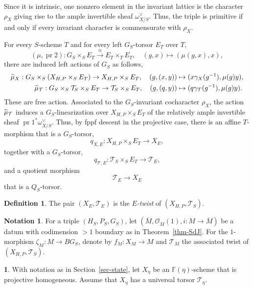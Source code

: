\documentclass[11pt]{article}
\theoremstyle{definition}
\newtheorem{defi}[theo]{Definition}
\newtheorem{nota}[theo]{Notation}
\newcommand{\enoncename}{}
\newtheorem{corpusenonce}[theo]{\enoncename}
\newenvironment{enonce}[1]{\renewcommand{\enoncename}{#1}\begin{corpusenonce}}{\end{corpusenonce}}
\numberwithin{equation}{section}
\numberwithin{figure}{section}
\numberwithin{table}{section}
\newcommand{\mbb}{\mathbb}
\newcommand{\FF}{\mbb{F}}
\newcommand{\mc}{\mathcal}
\newcommand{\mcT}{\mc{T}}
\newcommand{\OO}{\mc{O}}
\newcommand{\ol}{\overline}
\newcommand{\Xx}{X}
\DeclareMathOperator{\prm}{pr}
\let\oldtilde\tilde
\renewcommand*{\tilde}[1]{\mathchoice{\widetilde{#1}}{\widetilde{#1}}{\oldtilde{#1}}{\oldtilde{#1}}}\let\oldhat\hat
\renewcommand*{\hat}[1]{\mathchoice{\widehat{#1}}{\widehat{#1}}{\oldhat{#1}}{\oldhat{#1}}}
\begin{document}
Since it is intrinsic, one nonzero element in the invariant lattice is the character $\rho_X$ giving rise to the ample invertible sheaf $\omega^\vee_{X/S}$. Thus, the triple is primitive if and only if every invariant character is commensurate with $\rho_X$.

For every $S$-scheme $T$ and for every left $G_S$-torsor $E_T$ over $T$,
\[
(\mu,\prm{2}):G_S\times_S E_T \xrightarrow{\cong} E_T\times_T E_T,\quad (g,x)\mapsto (\mu(g,x),x),
\]
there are induced left actions of $G_S$ as follows,
\begin{align*}
\tilde{\mu}_X:G_S \times_S (X_{H,P}\times_S E_T) \to X_{H,P}\times_S E_T, \quad (g,(x,y)) &\mapsto (x\gamma_X(g^{-1}),\mu(g)y),
\\
\tilde{\mu}_\mcT:G_S \times_S \mcT_S\times_S E_T \to
\mcT_S\times_S E_T, \quad (g,(q,y))&\mapsto (q\gamma_\mcT(g^{-1}),\mu(g)y).
\end{align*}
These are free action. Associated to the $G_S$-invariant cocharacter $\rho_X$, the action $\tilde{\mu}_\mcT$ induces a $G_S$-linearization over $X_{H,P}\times_S E_T$ of the relatively ample invertible sheaf $\prm{1}^*\omega_{X/S}^\vee$. Thus, by fppf descent in the projective case, there is an affine $T$-morphism that is a $G_S$-torsor,
\[
q_{\Xx,E}: \Xx_{H,P}\times_S E_T \to \Xx_E,
\]
together with a $G_S$-torsor,
\[
q_{\mcT,E}:\mcT_S \times_S E_T \to \mcT_E,
\]
and a quotient morphism
\[
\mcT_E \to \Xx_E
\]
that is a $Q_S$-torsor.

\goodbreak
\begin{defi} \label{defn-twist}
The pair $(\Xx_E,\mcT_E)$ is the \emph{$E$-twist} of $(\Xx_{H,P},\mcT_S)$.
\end{defi}

\begin{nota}\label{notat-prim}
For a triple $(H_S,P_S,G_S)$, let $(\ol{M},\OO_{\ol{M}}(1), i:M\to \ol{M})$ be a datum with codimension $>1$ boundary as in Theorem~\ref{thm-SdJ}. For the $1$-morphism $\zeta_M:M\to BG_S$, denote by $f_M:\Xx_M \to M$ and $\mcT_M$ the associated twist of $(\Xx_{H,P},\mcT_S)$.
\end{nota}

\begin{enonce}
{Hypothesis} \label{hyp-group}
With notation as in Section~\ref{sec-state}, let $X_\eta$ be an $\FF(\eta)$-scheme that is projective homogeneous. Assume that $X_\eta$ has a universal torsor $\mcT_\eta$.
\end{enonce}
\end{document}

